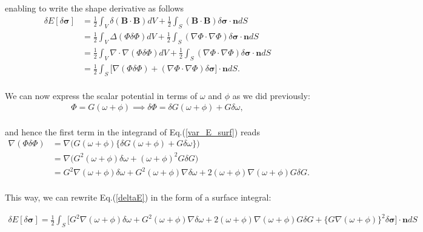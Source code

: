 \documentclass[aps,prc,floatfix,showkeys,nofootinbib]{revtex4-1}
\newcommand{\beq}{\begin{equation}}
\newcommand{\eeq}{\end{equation}}
\newcommand{\BB}{\textbf{B}}
\newcommand{\Div}{\nabla\cdot}
\newcommand{\grad}{\nabla}
\begin{document}
\noindent enabling to write the shape derivative as follows\\

\beq
\begin{split}
\delta E[\delta \bm{\sigma}] &= \frac{1}{2}\int_V\delta(\BB \cdot \BB)dV + \frac{1}{2}\int_S (\BB\cdot \BB) \delta \bm{\sigma}\cdot \mathbf{n} dS\\
& =\frac{1}{2} \int_V \Delta(\varPhi  \delta\varPhi)dV + \frac{1}{2}\int_S (\grad\varPhi\cdot \grad \varPhi) \delta \bm{\sigma}\cdot \mathbf{n} dS\\
&= \frac{1}{2}\int_V \Div \grad(\varPhi  \delta\varPhi)dV + \frac{1}{2}\int_S (\grad\varPhi\cdot \grad \varPhi) \delta \bm{\sigma}\cdot \mathbf{n} dS\\
&= \frac{1}{2}\int_S \Bigg[\grad(\varPhi  \delta\varPhi) + (\grad\varPhi\cdot \grad \varPhi) \delta \bm{\sigma} \Bigg]\cdot \mathbf{n}dS.
\end{split}\label{var_E_surf}
\eeq\\

\noindent We can now express the scalar potential in terms of $\omega$ and $\phi$ as we did previously:\\ 

\beq
\begin{split}
\varPhi = G(\omega + \phi) \implies \delta \varPhi = \delta G(\omega + \phi ) + G \delta \omega,
\end{split}
\eeq\\

\noindent and hence the first term in the integrand of Eq.(\ref{var_E_surf}) reads\\

\beq
\begin{split}
\grad(\varPhi\delta\varPhi) &= \grad\Big(G(\omega + \phi)\Big\{ \delta G(\omega + \phi) + G \delta \omega \Big\} \Big)\\
&= \grad \Big( G^2(\omega + \phi)\delta \omega + (\omega + \phi)^2 G \delta G\Big)\\
&= G^2 \grad(\omega+\phi) \delta \omega + G^2(\omega + \phi)\grad \delta \omega + 2(\omega + \phi)\grad (\omega + \phi)G \delta G.
\end{split}
\eeq\\

\noindent This way, we can rewrite Eq.(\ref{deltaE}) in the form of a surface integral: 

\beq
\begin{split}
\delta E[\delta \bm{\sigma}] = \frac{1}{2}\int_S \Bigg[G^2 \grad(\omega+\phi) \delta \omega + G^2(\omega + \phi)\grad \delta \omega + 2(\omega + \phi)\grad (\omega + \phi)G \delta G + \{G\grad (\omega + \phi)\}^2 \delta \bm{\sigma}\Bigg]\cdot \mathbf{n}dS
\end{split}\label{dEdS}
\eeq\\
\end{document}
